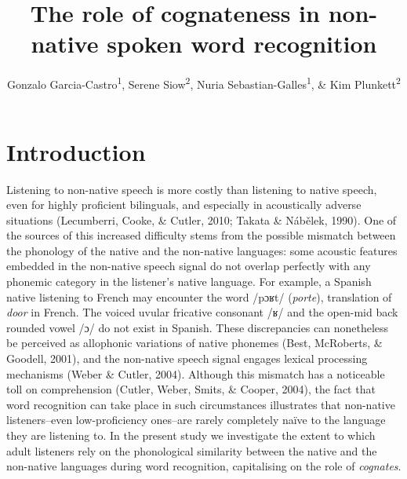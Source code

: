 \documentclass[
  english,
  man,floatsintext]{apa6}
\title{The role of cognateness in non-native spoken word recognition}
\author{Gonzalo Garcia-Castro\textsuperscript{1}, Serene Siow\textsuperscript{2}, Nuria Sebastian-Galles\textsuperscript{1}, \& Kim Plunkett\textsuperscript{2}}
\date{}
\affiliation{\vspace{0.5cm}\textsuperscript{1} Center for Brain and Cognition, Universitat Pompeu Fabra\\\textsuperscript{2} Department of Experimental Psychology, University of Oxford}
\begin{document}
\maketitle

\hypertarget{introduction}{%
\section{Introduction}\label{introduction}}

Listening to non-native speech is more costly than listening to native speech, even for highly proficient bilinguals, and especially in acoustically adverse situations (Lecumberri, Cooke, \& Cutler, 2010; Takata \& Nábělek, 1990). One of the sources of this increased difficulty stems from the possible mismatch between the phonology of the native and the non-native languages: some acoustic features embedded in the non-native speech signal do not overlap perfectly with any phonemic category in the listener's native language. For example, a Spanish native listening to French may encounter the word /pɔʁt/ (\emph{porte}), translation of \emph{door} in French. The voiced uvular fricative consonant /ʁ/ and the open-mid back rounded vowel /ɔ/ do not exist in Spanish. These discrepancies can nonetheless be perceived as allophonic variations of native phonemes (Best, McRoberts, \& Goodell, 2001), and the non-native speech signal engages lexical processing mechanisms (Weber \& Cutler, 2004). Although this mismatch has a noticeable toll on comprehension (Cutler, Weber, Smits, \& Cooper, 2004), the fact that word recognition can take place in such circumstances illustrates that non-native listeners--even low-proficiency ones--are rarely completely naïve to the language they are listening to. In the present study we investigate the extent to which adult listeners rely on the phonological similarity between the native and the non-native languages during word recognition, capitalising on the role of \emph{cognates}.
\end{document}
